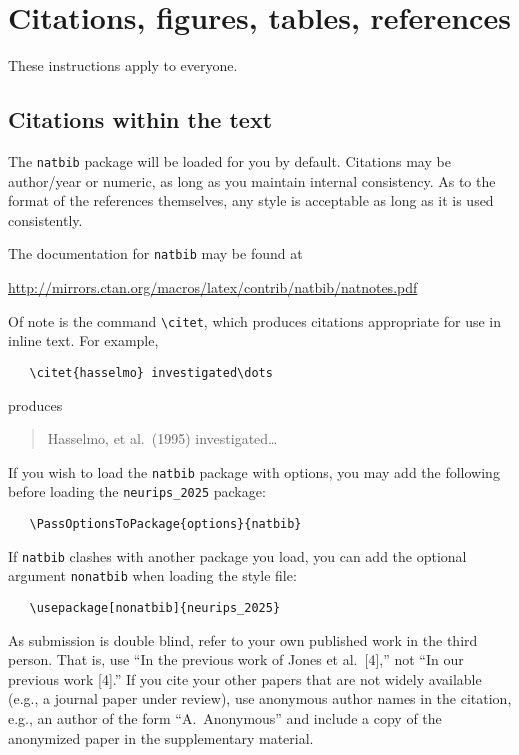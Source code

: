 \documentclass{article}
\begin{document}
\section{Citations, figures, tables, references}
\label{others}


These instructions apply to everyone.


\subsection{Citations within the text}


The \verb+natbib+ package will be loaded for you by default.  Citations may be
author/year or numeric, as long as you maintain internal consistency.  As to the
format of the references themselves, any style is acceptable as long as it is
used consistently.


The documentation for \verb+natbib+ may be found at
\begin{center}
  \url{http://mirrors.ctan.org/macros/latex/contrib/natbib/natnotes.pdf}
\end{center}
Of note is the command \verb+\citet+, which produces citations appropriate for
use in inline text.  For example,
\begin{verbatim}
   \citet{hasselmo} investigated\dots
\end{verbatim}
produces
\begin{quote}
  Hasselmo, et al.\ (1995) investigated\dots
\end{quote}


If you wish to load the \verb+natbib+ package with options, you may add the
following before loading the \verb+neurips_2025+ package:
\begin{verbatim}
   \PassOptionsToPackage{options}{natbib}
\end{verbatim}


If \verb+natbib+ clashes with another package you load, you can add the optional
argument \verb+nonatbib+ when loading the style file:
\begin{verbatim}
   \usepackage[nonatbib]{neurips_2025}
\end{verbatim}


As submission is double blind, refer to your own published work in the third
person. That is, use ``In the previous work of Jones et al.\ [4],'' not ``In our
previous work [4].'' If you cite your other papers that are not widely available
(e.g., a journal paper under review), use anonymous author names in the
citation, e.g., an author of the form ``A.\ Anonymous'' and include a copy of the anonymized paper in the supplementary material.
\end{document}

